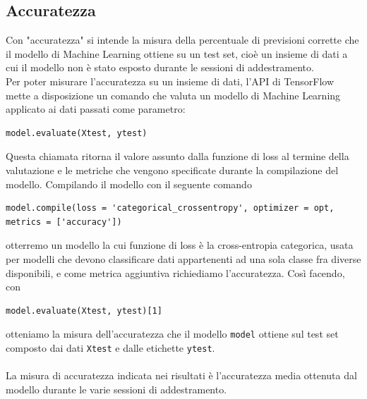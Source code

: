 \subsection{Accuratezza}
Con "accuratezza" si intende la misura della percentuale di previsioni corrette che il modello di Machine Learning ottiene su un test set, cioè un insieme di dati a cui il modello non è stato esposto durante le sessioni di addestramento.\\
Per poter misurare l'accuratezza su un insieme di dati, l'API di TensorFlow mette a disposizione un comando che valuta un modello di Machine Learning applicato ai dati passati come parametro:
\begin{lstlisting}[style = myPython]
model.evaluate(Xtest, ytest)
\end{lstlisting}
Questa chiamata ritorna il valore assunto dalla funzione di loss al termine della valutazione e le metriche che vengono specificate durante la compilazione del modello. Compilando il modello con il seguente comando
\begin{lstlisting}[style = myPython]
model.compile(loss = 'categorical_crossentropy', optimizer = opt, metrics = ['accuracy'])
\end{lstlisting}
otterremo un modello la cui funzione di loss è la cross-entropia categorica, usata per modelli che devono classificare dati appartenenti ad una sola classe fra diverse disponibili, e come metrica aggiuntiva richiediamo l'accuratezza. Così facendo, con
\begin{lstlisting}[style = myPython]
model.evaluate(Xtest, ytest)[1]
\end{lstlisting}
otteniamo la misura dell'accuratezza che il modello \texttt{model} ottiene sul test set composto dai dati \texttt{Xtest} e dalle etichette \texttt{ytest}.\\\\
La misura di accuratezza indicata nei risultati è l'accuratezza media ottenuta dal modello durante le varie sessioni di addestramento.
